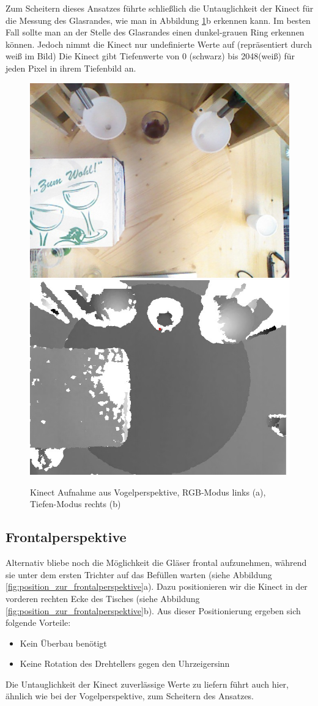 Zum Scheitern dieses Ansatzes führte schließlich die Untauglichkeit der Kinect für die Messung des Glasrandes, wie man in Abbildung \ref{fig:aufnahme_vogel}b erkennen kann. Im besten Fall sollte man an der Stelle des Glasrandes einen dunkel-grauen Ring erkennen können. Jedoch nimmt die Kinect nur undefinierte Werte auf (repräsentiert durch weiß im Bild) Die Kinect gibt Tiefenwerte von 0 (schwarz) bis 2048(weiß) für jeden Pixel in ihrem Tiefenbild an. 

\clearpage
\begin{figure}
	\centering
	\includegraphics[width=0.45\linewidth]{content/pictures/vogel_rgb}
	\includegraphics[width=0.45\linewidth]{content/pictures/vogel_depth}
	\caption{Kinect Aufnahme aus Vogelperspektive, RGB-Modus links (a), Tiefen-Modus rechts (b)}
	\label{fig:aufnahme_vogel}
\end{figure}

\subsection{Frontalperspektive}
Alternativ bliebe noch die Möglichkeit die Gläser frontal aufzunehmen, während sie unter dem ersten Trichter auf das Befüllen warten (siehe Abbildung \ref{fig:position_zur_frontalperspektive}a). Dazu positionieren wir die Kinect in der vorderen rechten Ecke des Tisches (siehe Abbildung \ref{fig:position_zur_frontalperspektive}b).
Aus dieser Positionierung ergeben sich folgende Vorteile:
\begin{itemize}
	\item Kein Überbau benötigt
	\item Keine Rotation des Drehtellers gegen den Uhrzeigersinn
\end{itemize}
Die Untauglichkeit der Kinect zuverlässige Werte zu liefern führt auch hier, ähnlich wie bei der Vogelperspektive, zum Scheitern des Ansatzes.

